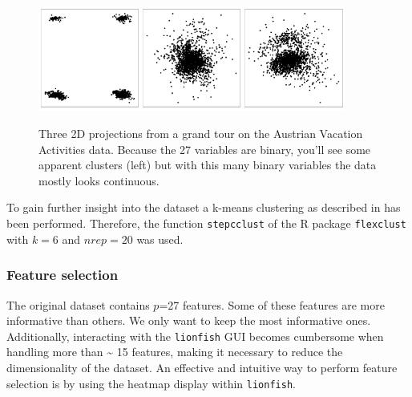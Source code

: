 \documentclass[article]{ajs}
\begin{document}
\begin{figure}[h]
\centerline{\includegraphics[width=0.3\textwidth]{images/winter_proj1.pdf}\includegraphics[width=0.3\textwidth]{images/winter_proj2.pdf}\includegraphics[width=0.3\textwidth]{images/winter_proj3.pdf}}
\caption{Three 2D projections from a grand tour on the Austrian Vacation Activities data. Because the 27 variables are binary, you'll see some apparent clusters (left) but with this many binary variables the data mostly looks continuous.}
\label{winter-gt}
\end{figure}


To gain further insight into the dataset a k-means clustering as described in \cite{leisch2018market} has been performed. Therefore, the function \texttt{stepcclust} of the R package \texttt{flexclust}\citep{flexclust} with $k=6$ and $nrep=20$ was used.

\subsubsection{Feature selection}

The original dataset contains \(p\)=27 features. Some of these features are more informative than others. We only want to keep the most informative ones. Additionally, interacting with the \texttt{lionfish} GUI becomes cumbersome when handling more than \textasciitilde
 15 features, making it necessary to reduce the dimensionality of the dataset. An effective and intuitive way to perform feature selection is by using the heatmap display within \texttt{lionfish}. 
\end{document}
